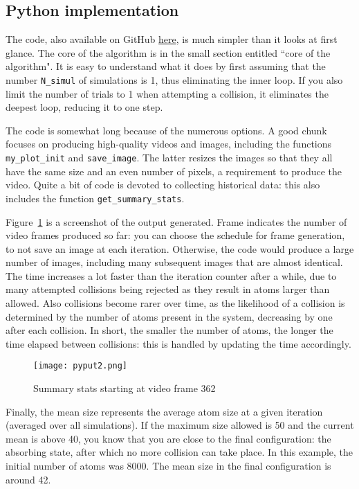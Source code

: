 \documentclass[oneside,10pt]{book}
\begin{document}
\subsection{Python implementation}\label{ioudert}

The code, also available on GitHub \href{https://github.com/VincentGranville/Visualizations/blob/main/Source-Code/atoms.py}{here}, 
 is much simpler  than it looks at first glance. The core of the algorithm is in the small
 section entitled ``core of the algorithm". It is easy to understand what it does by first assuming that the 
number \texttt{N\_simul} of simulations is 1, thus eliminating the inner loop. If you also limit the number of trials to 1 when
 attempting a collision, it eliminates the deepest loop, reducing it to one step. 

The code is somewhat long because of the numerous options. A good chunk focuses on producing high-quality videos and images,
 including the functions \texttt{my\_plot\_init} and \texttt{save\_image}. The latter resizes the images so that they all have the same size and an even 
 number of pixels, a requirement to produce the video. 
 Quite a bit of code is devoted to collecting historical data: this also includes the function \texttt{get\_summary\_stats}.
 
Figure~\ref{fig:pi12o8uy75} is a screenshot of the output generated. Frame indicates the number of video frames produced so far:
  you can choose the schedule for frame generation, to not save an image at each iteration. Otherwise, the code would produce a large number of images, including many subsequent images that are almost identical. The time increases a lot faster than the iteration counter after a while, due to many attempted collisions being rejected as they result in atoms larger than allowed. Also collisions become rarer over time, as the likelihood of a collision is determined by the number of atoms present in the system, decreasing by one after each collision.
 In short, the smaller the number of atoms, the longer the time elapsed between collisions: this is handled by updating the time accordingly. 
 

\begin{figure}[H]
\centering
\texttt{[image: pyput2.png]}  
\caption{Summary stats starting at video frame 362}
\label{fig:pi12o8uy75}
\end{figure}

Finally, the mean size represents the average atom size at a given iteration (averaged over all simulations). If the maximum size allowed is 50 and the current mean is above 40, you know that you are close to the final configuration: the absorbing state, after which no more collision can take place. In this example, the initial number of atoms was 8000. The mean size in the final configuration is around 42.
\end{document}
